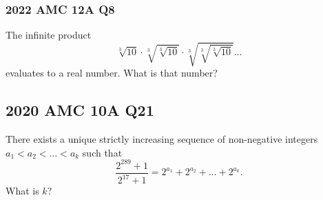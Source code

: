 \documentclass{article}
\begin{document}
\vspace{100px}

\subsubsection{2022 AMC 12A Q8}
The infinite product\[\sqrt[3]{10} \cdot \sqrt[3]{\sqrt[3]{10}} \cdot \sqrt[3]{\sqrt[3]{\sqrt[3]{10}}} \ldots\]evaluates to a real number. What is that number?

\pagebreak

\subsection{2020 AMC 10A Q21}

There exists a unique strictly increasing sequence of non-negative integers $a_1 < a_2 < … < a_k$ such that\[\frac{2^{289}+1}{2^{17}+1} = 2^{a_1} + 2^{a_2} + … + 2^{a_k}.\]What is $k?$
\end{document}
